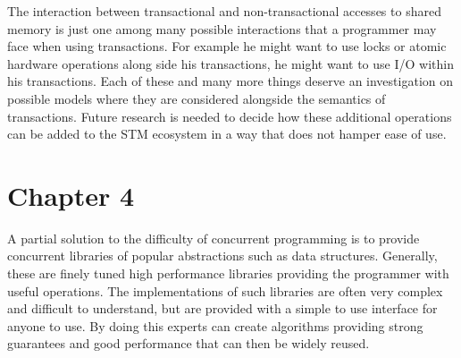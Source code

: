 \documentclass[runningheads,a4paper]{article}
\begin{document}
The interaction between transactional and non-transactional accesses to shared memory
is just one among many possible interactions that a programmer may face when using
transactions.
For example he might want to use locks or atomic hardware operations along side his transactions,
he might want to use I/O within his transactions.
Each of these and many more things deserve an investigation on possible models where
they are considered alongside the semantics of transactions.
Future research is needed to decide how these additional operations can be added
to the STM ecosystem in a way that does not hamper ease of use.








\section{Chapter 4}
A partial solution to the difficulty of concurrent programming
is to provide concurrent libraries of popular abstractions such as data structures.
Generally, these are finely tuned high performance libraries
providing the programmer with useful operations.
The implementations of such libraries are often very complex
and difficult to understand, but are provided with a simple to use
interface for anyone to use.
By doing this experts can create algorithms providing strong guarantees
and good performance that can then be widely reused.

% 
% 
\end{document}
